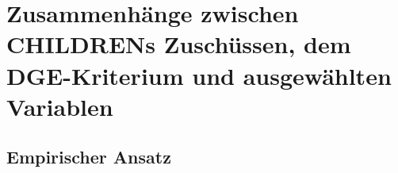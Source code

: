 
\section{Zusammenhänge zwischen CHILDRENs Zuschüssen, dem DGE-Kriterium und ausgewählten Variablen}

\subsection{Empirischer Ansatz}

